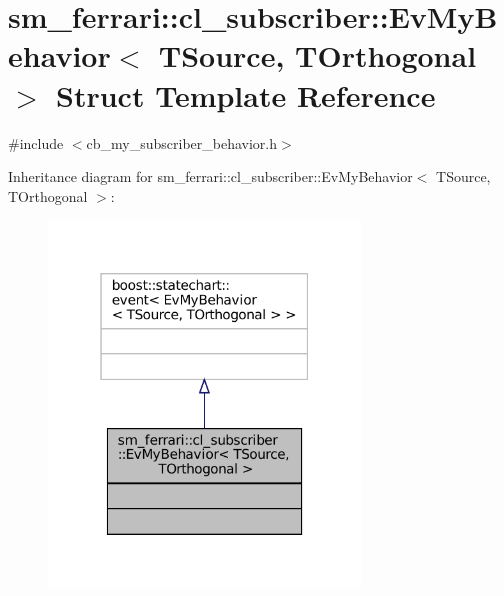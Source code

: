 \hypertarget{structsm__ferrari_1_1cl__subscriber_1_1EvMyBehavior}{}\section{sm\+\_\+ferrari\+:\+:cl\+\_\+subscriber\+:\+:Ev\+My\+Behavior$<$ T\+Source, T\+Orthogonal $>$ Struct Template Reference}
\label{structsm__ferrari_1_1cl__subscriber_1_1EvMyBehavior}


{\ttfamily \#include $<$cb\+\_\+my\+\_\+subscriber\+\_\+behavior.\+h$>$}



Inheritance diagram for sm\+\_\+ferrari\+:\+:cl\+\_\+subscriber\+:\+:Ev\+My\+Behavior$<$ T\+Source, T\+Orthogonal $>$\+:
\nopagebreak
\begin{figure}[H]
\begin{center}
\leavevmode
\includegraphics[width=235pt]{structsm__ferrari_1_1cl__subscriber_1_1EvMyBehavior__inherit__graph}
\end{center}
\end{figure}


